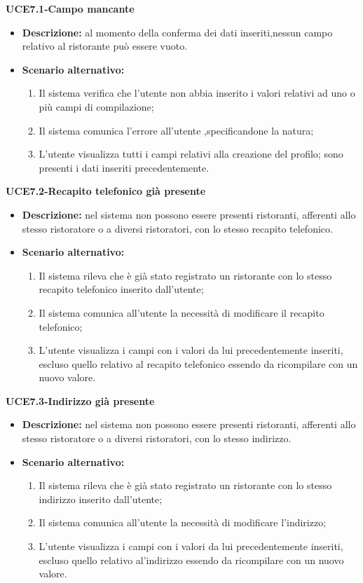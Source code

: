 \textbf{UCE7.1-Campo mancante}
\begin{itemize}
    \item \textbf{Descrizione: }al momento della conferma dei dati inseriti,nessun campo relativo al ristorante può essere vuoto.
    \item \textbf{Scenario alternativo:}
    \begin{enumerate}
        \item Il sistema verifica che l'utente non abbia inserito i valori relativi ad uno o più campi di
        compilazione;
        \item Il sistema comunica l'errore all'utente ,specificandone la natura;
        \item L'utente visualizza tutti i campi relativi alla creazione del profilo; sono presenti i dati inseriti precedentemente.
    \end{enumerate}
\end{itemize}

\textbf{UCE7.2-Recapito telefonico già presente}
\begin{itemize}
    \item \textbf{Descrizione: }nel sistema non possono essere presenti ristoranti, afferenti allo stesso ristoratore
    o a diversi ristoratori, con lo stesso recapito telefonico.
    \item \textbf{Scenario alternativo:}
    \begin{enumerate}
        \item Il sistema rileva che è già stato registrato un ristorante con lo stesso recapito telefonico
        inserito dall'utente;
        \item Il sistema comunica all'utente la necessità di modificare il recapito telefonico;
        \item L'utente visualizza i campi con i valori da lui precedentemente inseriti, escluso quello relativo al recapito telefonico
        essendo da ricompilare con un nuovo valore.
    \end{enumerate}
\end{itemize}

\textbf{UCE7.3-Indirizzo già presente}
\begin{itemize}
    \item \textbf{Descrizione: }nel sistema non possono essere presenti ristoranti, afferenti allo stesso ristoratore
    o a diversi ristoratori, con lo stesso indirizzo.
    \item \textbf{Scenario alternativo:}
    \begin{enumerate}
        \item Il sistema rileva che è già stato registrato un ristorante con lo stesso indirizzo
        inserito dall'utente;
        \item Il sistema comunica all'utente la necessità di modificare l'indirizzo;
        \item L'utente visualizza i campi con i valori da lui precedentemente inseriti, escluso quello relativo al'indirizzo
        essendo da ricompilare con un nuovo valore.
    \end{enumerate}
\end{itemize}

